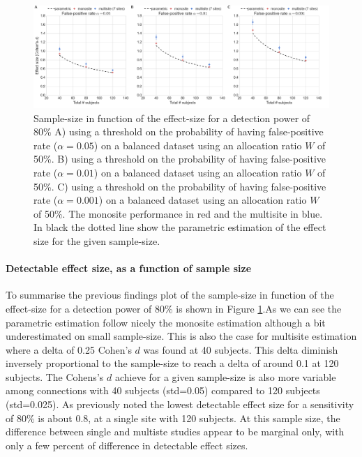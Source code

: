 \documentclass[authoryear]{elsarticle}
\begin{document}
\begin{figure}[tbp]
\centering
\includegraphics[width=\textwidth]{../figures/samplesize_x_effectsize.png}
\caption[]{
Sample-size in function of the effect-size for a detection power of 80\%
A) using a threshold on the probability of having false-positive rate ($\alpha=0.05$) on a balanced dataset using an allocation ratio $W$ of 50\%.
B) using a threshold on the probability of having false-positive rate ($\alpha=0.01$) on a balanced dataset using an allocation ratio $W$ of 50\%.
C) using a threshold on the probability of having false-positive rate ($\alpha=0.001$) on a balanced dataset using an allocation ratio $W$ of 50\%.
The monosite performance in red and the multisite in blue. In black the dotted line show the parametric estimation of the effect size for the given sample-size.
}
\label{fig_sampeffect_curves_alpha001}
\end{figure}

\paragraph{Detectable effect size, as a function of sample size} To summarise the previous findings plot of the sample-size in function of the effect-size for a detection power of 80\% is shown in Figure \ref{fig_sampeffect_curves_alpha001}.As we can see the parametric estimation follow nicely the monosite estimation although a bit underestimated on small sample-size. This is also the case for multisite estimation where a delta of 0.25 Cohen's $d$ was found at 40 subjects. This delta diminish inversely proportional to the sample-size to reach a delta of around 0.1 at 120 subjects. The Cohens's $d$ achieve for a given sample-size is also more variable among connections with 40 subjects (std=0.05) compared to 120 subjects (std=0.025). As previously noted the lowest detectable effect size for a sensitivity of 80\% is about 0.8, at a single site with 120 subjects. At this sample size, the difference between single and multiste studies appear to be marginal only, with only a few percent of difference in detectable effect sizes. 
\end{document}
